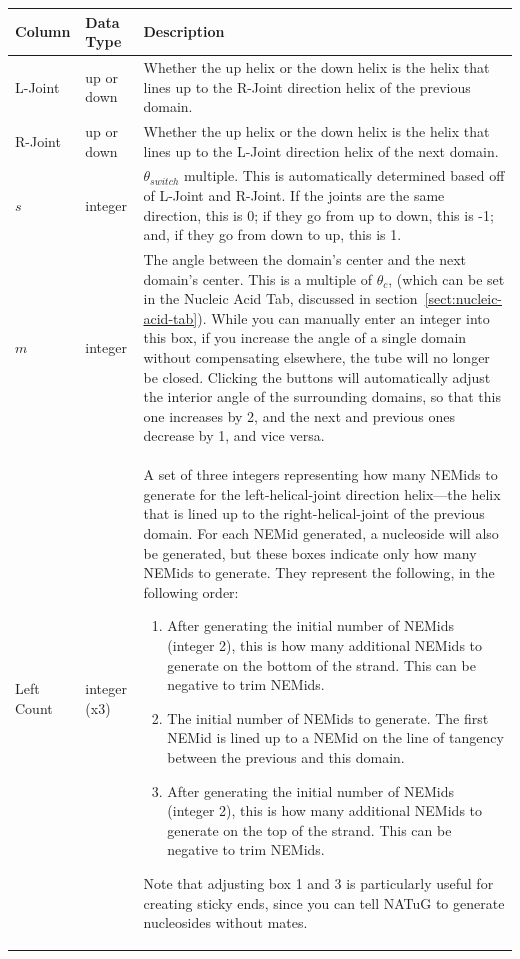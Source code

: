 \documentclass[
titlepage,
fontsize=12pt
]{article}
\begin{document}
	\begin{center}
		\begin{tabular}{|p{1in}|p{.7in}|p{3.5in}|}
			\label{tab:domains-table-settings-descriptions}
			Column & Data Type & Description \\ \hline
			L-Joint & up or down & Whether the up helix or the down helix is the helix that lines up to the R-Joint direction helix of the previous domain. \\ \hline
			
			R-Joint & up or down & Whether the up helix or the down helix is the helix that lines up to the L-Joint direction helix of the next domain. \\ \hline
			
			$s$ & integer & $\theta_{switch}$ multiple. This is automatically determined based off of L-Joint and R-Joint. If the joints are the same direction, this is 0; if they go from up to down, this is -1; and, if they go from down to up, this is 1. \\ \hline
			
			$m$ & integer & The angle between the domain’s center and the next domain’s center. This is a multiple of $\theta_{c}$, (which can be set in the Nucleic Acid Tab, discussed in section~\ref{sect:nucleic-acid-tab}). While you can manually enter an integer into this box, if you increase the angle of a single domain without compensating elsewhere, the tube will no longer be closed. Clicking the buttons will automatically adjust the interior angle of the surrounding domains, so that this one increases by 2, and the next and previous ones decrease by 1, and vice versa. \\ \hline
			
			Left Count & integer (x3) & A set of three integers representing how many NEMids to generate for the left-helical-joint direction helix---the helix that is lined up to the right-helical-joint of the previous domain. For each NEMid generated, a nucleoside will also be generated, but these boxes indicate only how many NEMids to generate. They represent the following, in the following order:
			\begin{enumerate}
				\item After generating the initial number of NEMids (integer 2), this is how many additional NEMids to generate on the bottom of the strand. This can be negative to trim NEMids.
				\item The initial number of NEMids to generate. The first NEMid is lined up to a NEMid on the line of tangency between the previous and this domain. 
				\item After generating the initial number of NEMids (integer 2), this is how many additional NEMids to generate on the top of the strand. This can be negative to trim NEMids.
			\end{enumerate}
			Note that adjusting box 1 and 3 is particularly useful for creating sticky ends, since you can tell NATuG to generate nucleosides without mates.
			\\ \hline
			

\end{tabular}
\end{center}
\end{document}
